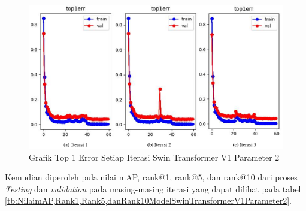 \begin{figure}[h!]
  \centering
  \includegraphics[scale=0.55]{gambar/Train SwinV1CP1 Top1Err.png}
  \caption{Grafik Top 1 Error Setiap Iterasi Swin Transformer V1 Parameter 2}
  \label{fig:grafiktop1errdariswinv1parameter2}
\end{figure}


Kemudian diperoleh pula nilai mAP, rank@1, rank@5, dan rank@10 dari proses \emph{Testing} 
dan \emph{validation} pada masing-masing iterasi yang dapat dilihat pada 
tabel \ref{tb:NilaimAP,Rank1,Rank5,danRank10ModelSwinTransformerV1Parameter2}.

